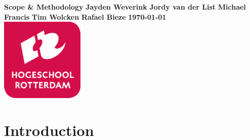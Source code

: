 \documentclass{article}
\begin{document}
\begin{titlepage}
  \centering
    \vfill
    {\bfseries\Huge
	    Scope \& Methodology
        \vskip2cm
      }
      {\bfseries\Large
        Jayden Weverink
        \vskip0cm
      }
      {\bfseries\Large
        Jordy van der List
        \vskip0cm
      }
      {\bfseries\Large
        Michael Francis
        \vskip0cm
      }
      {\bfseries\Large
        Tim Wolcken
        \vskip0cm
      }
      {\bfseries\Large
        Rafael Bieze
        \vskip0cm
      }
      {
        \bfseries\normalsize
        \vskip1cm
        \today\\
    }
    \vfill
    \includegraphics[width=4cm]{logohr.png} %
    \vfill
    \vfill
\end{titlepage}
\newpage
\tableofcontents

\setlength{\parindent}{0em}
\setlength{\parskip}{1em}
\flushleft

\clearpage %
\section{Introduction}


\clearpage %


\newpage



\end{document}
